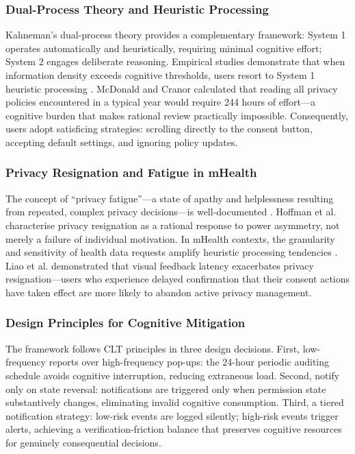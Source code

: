 \subsubsection{Dual-Process Theory and Heuristic Processing}

Kahneman's dual-process theory \cite{22} provides a complementary framework: System 1 operates automatically and heuristically, requiring minimal cognitive effort; System 2 engages deliberate reasoning. Empirical studies demonstrate that when information density exceeds cognitive thresholds, users resort to System 1 heuristic processing \cite{12,13}. McDonald and Cranor \cite{12} calculated that reading all privacy policies encountered in a typical year would require 244 hours of effort—a cognitive burden that makes rational review practically impossible. Consequently, users adopt satisficing strategies: scrolling directly to the consent button, accepting default settings, and ignoring policy updates.

\subsubsection{Privacy Resignation and Fatigue in mHealth}

The concept of ``privacy fatigue''—a state of apathy and helplessness resulting from repeated, complex privacy decisions—is well-documented \cite{10}. Hoffman et al. \cite{10} characterise privacy resignation as a rational response to power asymmetry, not merely a failure of individual motivation. In mHealth contexts, the granularity and sensitivity of health data requests amplify heuristic processing tendencies \cite{14}. Liao et al. \cite{14} demonstrated that visual feedback latency exacerbates privacy resignation—users who experience delayed confirmation that their consent actions have taken effect are more likely to abandon active privacy management.

\subsubsection{Design Principles for Cognitive Mitigation}

The framework follows CLT principles in three design decisions. First, low-frequency reports over high-frequency pop-ups: the 24-hour periodic auditing schedule avoids cognitive interruption, reducing extraneous load. Second, notify only on state reversal: notifications are triggered only when permission state substantively changes, eliminating invalid cognitive consumption. Third, a tiered notification strategy: low-risk events are logged silently; high-risk events trigger alerts, achieving a verification-friction balance that preserves cognitive resources for genuinely consequential decisions.

